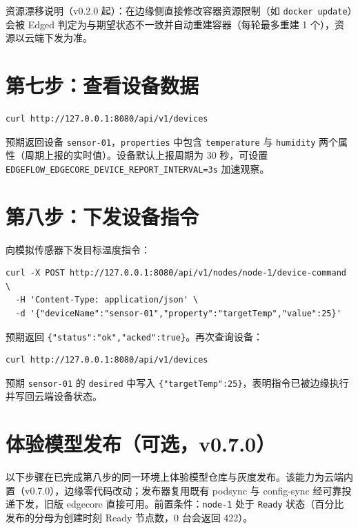 \begin{note}资源漂移说明（v0.2.0 起）：在边缘侧直接修改容器资源限制（如 \texttt{docker update}）会被 Edged 判定为与期望状态不一致并自动重建容器（每轮最多重建 1 个），资源以云端下发为准。\end{note}

\section{第七步：查看设备数据}

\begin{lstlisting}
curl http://127.0.0.1:8080/api/v1/devices
\end{lstlisting}

预期返回设备 \texttt{sensor-01}，\texttt{properties} 中包含 \texttt{temperature} 与 \texttt{humidity} 两个属性（周期上报的实时值）。设备默认上报周期为 30 秒，可设置 \texttt{EDGEFLOW\_EDGECORE\_DEVICE\_REPORT\_INTERVAL=3s} 加速观察。

\section{第八步：下发设备指令}

向模拟传感器下发目标温度指令：

\begin{lstlisting}
curl -X POST http://127.0.0.1:8080/api/v1/nodes/node-1/device-command \
  -H 'Content-Type: application/json' \
  -d '{"deviceName":"sensor-01","property":"targetTemp","value":25}'
\end{lstlisting}

预期返回 \texttt{\{"status":"ok","acked":true\}}。再次查询设备：

\begin{lstlisting}
curl http://127.0.0.1:8080/api/v1/devices
\end{lstlisting}

预期 \texttt{sensor-01} 的 \texttt{desired} 中写入 \texttt{\{"targetTemp":25\}}，表明指令已被边缘执行并写回云端设备状态。

\section{体验模型发布（可选，v0.7.0）}

以下步骤在已完成第八步的同一环境上体验模型仓库与灰度发布。该能力为云端内置（v0.7.0），边缘零代码改动；发布器复用既有 podsync 与 config-sync 经可靠投递下发，旧版 edgecore 直接可用。前置条件：\texttt{node-1} 处于 \texttt{Ready} 状态（百分比发布的分母为创建时刻 Ready 节点数，0 台会返回 422）。

